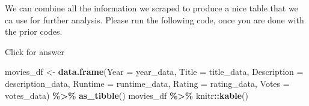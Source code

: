 \documentclass[
]{book}
\newenvironment{Shaded}{\begin{snugshade}}{\end{snugshade}}
\newcommand{\AttributeTok}[1]{\textcolor[rgb]{0.13,0.29,0.53}{#1}}
\newcommand{\FunctionTok}[1]{\textcolor[rgb]{0.13,0.29,0.53}{\textbf{#1}}}
\newcommand{\NormalTok}[1]{#1}
\newcommand{\OtherTok}[1]{\textcolor[rgb]{0.56,0.35,0.01}{#1}}
\newcommand{\SpecialCharTok}[1]{\textcolor[rgb]{0.81,0.36,0.00}{\textbf{#1}}}
\begin{document}
We can combine all the information we scraped to produce a nice table that we ca use for further analysis. Please run the following code, once you are done with the prior codes.

Click for answer

\begin{Shaded}
\begin{Highlighting}[]
\NormalTok{movies\_df }\OtherTok{\textless{}{-}} \FunctionTok{data.frame}\NormalTok{(}\AttributeTok{Year =}\NormalTok{ year\_data,}
                      \AttributeTok{Title =}\NormalTok{ title\_data,}
                      \AttributeTok{Description =}\NormalTok{ description\_data, }
                      \AttributeTok{Runtime =}\NormalTok{ runtime\_data,}
                      \AttributeTok{Rating =}\NormalTok{ rating\_data,}
                      \AttributeTok{Votes =}\NormalTok{ votes\_data) }\SpecialCharTok{\%\textgreater{}\%} \FunctionTok{as\_tibble}\NormalTok{()}
\NormalTok{movies\_df }\SpecialCharTok{\%\textgreater{}\%}\NormalTok{ knitr}\SpecialCharTok{::}\FunctionTok{kable}\NormalTok{()}
\end{Highlighting}
\end{Shaded}
\end{document}
